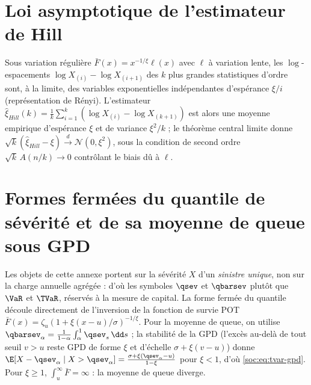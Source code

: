 \section{Loi asymptotique de l'estimateur de Hill}
\label{soc:ann:hill}
Sous variation régulière $\bar F(x)=x^{-1/\xi}\ell(x)$ avec $\ell$ à variation lente, les $\log$-espacements $\log X_{(i)}-\log X_{(i+1)}$ des $k$ plus grandes statistiques d'ordre sont, à la limite, des variables exponentielles indépendantes d'espérance $\xi/i$ (représentation de Rényi). L'estimateur $\hat\xi_{Hill}(k)=\frac1k\sum_{i=1}^k(\log X_{(i)}-\log X_{(k+1)})$ est alors une moyenne empirique d'espérance $\xi$ et de variance $\xi^2/k$ ; le théorème central limite donne $\sqrt k(\hat\xi_{Hill}-\xi)\xrightarrow{d}\mathcal N(0,\xi^2)$, sous la condition de second ordre $\sqrt k\,A(n/k)\to0$ contrôlant le biais dû à $\ell$.


\section{Formes fermées du quantile de sévérité et de sa moyenne de queue sous GPD}
\label{soc:ann:varestvar}
Les objets de cette annexe portent sur la sévérité $X$ d'un \emph{sinistre unique}, non sur la charge annuelle agrégée : d'où les symboles $\qsev$ et $\qbarsev$ plutôt que $\VaR$ et $\TVaR$, réservés à la mesure de capital. La forme fermée du quantile découle directement de l'inversion de la fonction de survie POT $\bar F(x)=\zeta_u(1+\xi(x-u)/\sigma)^{-1/\xi}$. Pour la moyenne de queue, on utilise $\qbarsev_\alpha=\frac{1}{1-\alpha}\int_\alpha^1\qsev_s\,\dd s$ ; la stabilité de la GPD (l'excès au-delà de tout seuil $v>u$ reste GPD de forme $\xi$ et d'échelle $\sigma+\xi(v-u)$) donne $\E[X-\qsev_\alpha\mid X>\qsev_\alpha]=\frac{\sigma+\xi(\qsev_\alpha-u)}{1-\xi}$ pour $\xi<1$, d'où \eqref{soc:eq:tvar-gpd}. Pour $\xi\ge1$, $\int_u^\infty\bar F=\infty$ : la moyenne de queue diverge.


